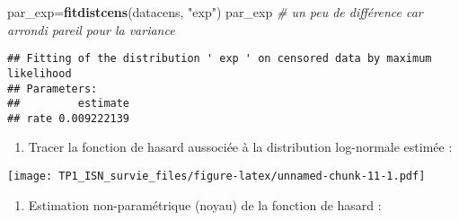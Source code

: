 \documentclass[
]{article}
\newenvironment{Shaded}{\begin{snugshade}}{\end{snugshade}}
\newcommand{\CommentTok}[1]{\textcolor[rgb]{0.56,0.35,0.01}{\textit{#1}}}
\newcommand{\ControlFlowTok}[1]{\textcolor[rgb]{0.13,0.29,0.53}{\textbf{#1}}}
\newcommand{\DataTypeTok}[1]{\textcolor[rgb]{0.13,0.29,0.53}{#1}}
\newcommand{\DecValTok}[1]{\textcolor[rgb]{0.00,0.00,0.81}{#1}}
\newcommand{\KeywordTok}[1]{\textcolor[rgb]{0.13,0.29,0.53}{\textbf{#1}}}
\newcommand{\NormalTok}[1]{#1}
\newcommand{\OperatorTok}[1]{\textcolor[rgb]{0.81,0.36,0.00}{\textbf{#1}}}
\newcommand{\OtherTok}[1]{\textcolor[rgb]{0.56,0.35,0.01}{#1}}
\newcommand{\StringTok}[1]{\textcolor[rgb]{0.31,0.60,0.02}{#1}}
\providecommand{\tightlist}{%
  \setlength{\itemsep}{0pt}\setlength{\parskip}{0pt}}
\begin{document}
\begin{Shaded}
\begin{Highlighting}[]
\NormalTok{par_exp=}\KeywordTok{fitdistcens}\NormalTok{(datacens, }\StringTok{"exp"}\NormalTok{)}
\NormalTok{par_exp }\CommentTok{# un peu de différence car arrondi pareil pour la variance}
\end{Highlighting}
\end{Shaded}

\begin{verbatim}
## Fitting of the distribution ' exp ' on censored data by maximum likelihood 
## Parameters:
##         estimate
## rate 0.009222139
\end{verbatim}

\begin{enumerate}
\def\labelenumi{\arabic{enumi})}
\setcounter{enumi}{11}
\tightlist
\item
  Tracer la fonction de hasard aussociée à la distribution log-normale
  estimée :
\end{enumerate}

\begin{Shaded}
\end{Shaded}

\texttt{[image: TP1\_ISN\_survie\_files/figure-latex/unnamed-chunk-11-1.pdf]}

\begin{enumerate}
\def\labelenumi{\arabic{enumi})}
\setcounter{enumi}{12}
\tightlist
\item
  Estimation non-paramétrique (noyau) de la fonction de hasard :
\end{enumerate}
\end{document}
